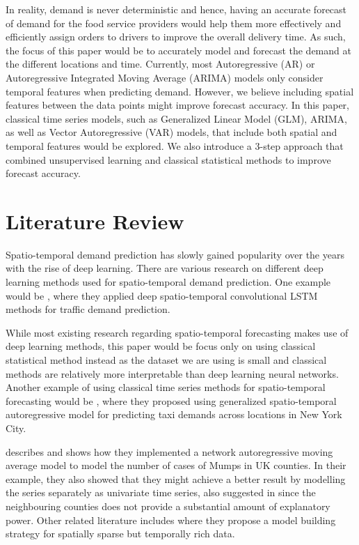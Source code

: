 \documentclass[12pt, letterpaper] {article}
\begin{document}
\noindent In reality, demand is never deterministic and hence, having an accurate forecast of demand for the food service providers would help them more effectively and efficiently assign orders to drivers to improve the overall delivery time. As such, the focus of this paper would be to accurately model and forecast the demand at the different locations and time. Currently, most Autoregressive (AR) or Autoregressive Integrated Moving Average (ARIMA) models only consider temporal features when predicting demand. However, we believe including spatial features between the data points might improve forecast accuracy. In this paper, classical time series models, such as Generalized Linear Model (GLM), ARIMA, as well as Vector Autoregressive (VAR) models, that include both spatial and temporal features would be explored. We also introduce a 3-step approach that combined unsupervised learning and classical statistical methods to improve forecast accuracy. 

\newpage
\section{Literature Review}

\noindent Spatio-temporal demand prediction has slowly gained popularity over the years with the rise of deep learning. There are various research on different deep learning methods used for spatio-temporal demand prediction. One example would be \cite{Wang2018}, where they applied deep spatio-temporal convolutional LSTM methods for traffic demand prediction. 

\noindent While most existing research regarding spatio-temporal forecasting makes use of deep learning methods, this paper would be focus only on using classical statistical method instead as the dataset we are using is small and classical methods are relatively more interpretable than deep learning neural networks. Another example of using classical time series methods for spatio-temporal forecasting would be \cite{Abolfazl2017}, where they proposed using generalized spatio-temporal autoregressive model for predicting taxi demands across locations in New York City. 

\noindent \cite{Marina2016} describes and shows how they implemented a network autoregressive moving average model to model the number of cases of Mumps in UK counties. In their example, they also showed that they might achieve a better result by modelling the series separately as univariate time series, also suggested in \cite{Nunes2015} since the neighbouring counties does not provide a substantial amount of explanatory power.  Other related literature includes \cite{Xavier2005} where they propose a model building strategy for spatially sparse but temporally rich data. 
\end{document}
